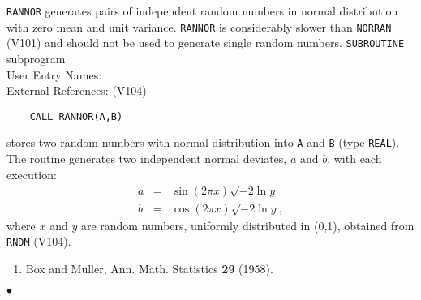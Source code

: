                             
                         
                    
                            
{\tt RANNOR} generates pairs of independent random numbers in normal
distribution with zero mean and unit variance. {\tt RANNOR} is
considerably slower than {\tt NORRAN} (V101) and should not be used to
generate single random numbers.
\Structure
{\tt SUBROUTINE} subprogram \\
User Entry  Names: \\
External References:  (V104)
\Usage
\begin{verbatim}
    CALL RANNOR(A,B)
\end{verbatim}
stores two random numbers with normal distribution into {\tt A} and
{\tt B} (type {\tt REAL}).
\Method
The routine generates two independent normal deviates, $a$ and $b$,
with each execution:
\begin{eqnarray*}
a & = & \sin(2\pi x)\sqrt{-2 \ln y} \\
b & = & \cos(2\pi x)\sqrt{-2 \ln y},
\end{eqnarray*}
where $x$ and $y$ are random numbers, uniformly distributed in (0,1),
obtained from {\tt RNDM} (V104).
\Refer
\begin{enumerate}
\item Box and Muller, Ann. Math. Statistics {\bf 29} (1958).
\end{enumerate}
$\bullet$
